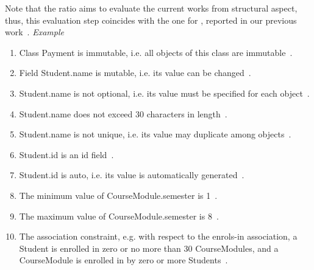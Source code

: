 	Note that the ratio aims to evaluate the current works from structural aspect, thus, this evaluation step coincides with the one for \dcsl, reported in our previous work~\cite{le_domain_2018}. %
	\textit{Example}
	\begin{enumerate}
		\item Class Payment is immutable, i.e. all objects of this class are immutable~.
		\item Field Student.name is mutable, i.e. its value can be changed~.
		\item Student.name is not optional, i.e. its value must be specified for each object~.
		\item Student.name does not exceed 30 characters in length~.
		\item Student.name is not unique, i.e. its value may duplicate among objects~.
		\item Student.id is an id field~.
		\item Student.id is auto, i.e. its value is automatically generated~.
		\item The minimum value of CourseModule.semester is 1~.
		\item The maximum value of CourseModule.semester is 8~.
		\item The association constraint, e.g. with respect to the enrols-in association, a Student is enrolled in zero or no more than 30 CourseModules,
		and a CourseModule is enrolled in by zero or more Students~.
	\end{enumerate}